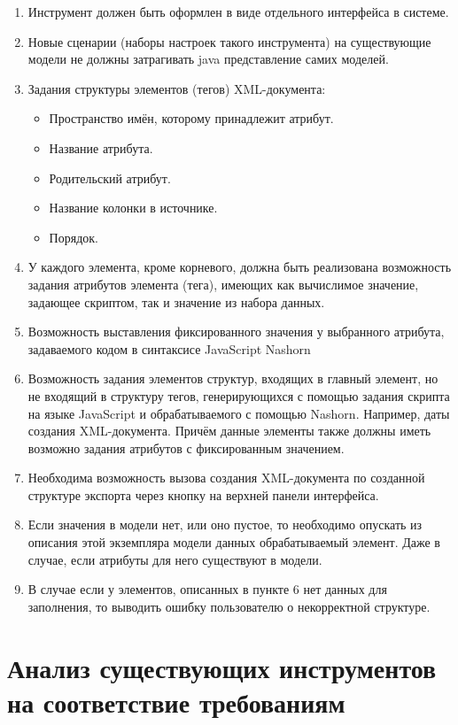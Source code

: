 \documentclass[a4paper,12pt]{diplom}
\begin{document}
\begin{enumerate}[label=\arabic{enumi})]
	\item Инструмент должен быть оформлен в виде отдельного интерфейса в системе.
    \item Новые сценарии (наборы настроек такого инструмента) на существующие модели не должны затрагивать java представление самих моделей.
    \item Задания структуры элементов (тегов) XML-документа:
        \begin{itemize}
	       \item Пространство имён, которому принадлежит атрибут.
	       \item Название атрибута.
	       \item Родительский атрибут.
              \item Название колонки в источнике.
              \item Порядок.
	  \end{itemize}
    \item У каждого элемента, кроме корневого, должна быть реализована возможность задания атрибутов элемента (тега), имеющих как вычислимое значение, задающее скриптом, так и значение из набора данных.
    \item Возможность выставления фиксированного значения у выбранного атрибута, задаваемого кодом в синтаксисе JavaScript Nashorn
    \item Возможность задания элементов структур, входящих в главный элемент, но не входящий в структуру тегов, генерирующихся с помощью задания скрипта на языке JavaScript и обрабатываемого с помощью Nashorn. Например, даты создания XML-документа. Причём данные элементы также должны иметь возможно задания атрибутов с фиксированным значением.
    \item Необходима возможность вызова создания XML-документа по созданной структуре экспорта через кнопку на верхней панели интерфейса.
    \item Если значения в модели нет, или оно пустое, то необходимо опускать из описания этой экземпляра модели данных обрабатываемый элемент. Даже в случае, если атрибуты для него существуют в модели.
    \item В случае если у элементов, описанных в пункте 6 нет данных для заполнения, то выводить ошибку пользователю о некорректной структуре.
\end{enumerate}

\section{Анализ существующих инструментов на соответствие требованиям}
\end{document}
